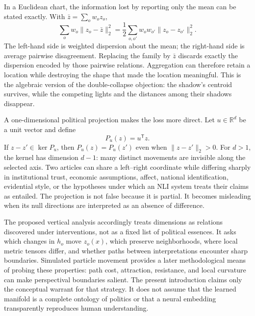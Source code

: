 In a Euclidean chart, the information lost by reporting only the mean can be stated exactly. With \(\bar z=\sum_o w_o z_o\),
\begin{equation}
    \sum_o w_o\lVert z_o-\bar z\rVert_2^2
    =\frac{1}{2}\sum_{o,o'}w_ow_{o'}
      \lVert z_o-z_{o'}\rVert_2^2.
    \label{eq:pairwise-dispersion}
\end{equation}
The left-hand side is weighted dispersion about the mean; the right-hand side is average pairwise disagreement. Replacing the family by \(\bar z\) discards exactly the dispersion encoded by those pairwise relations. Aggregation can therefore retain a location while destroying the shape that made the location meaningful. This is the algebraic version of the double-collapse objection: the shadow's centroid survives, while the competing lights and the distances among their shadows disappear.

A one-dimensional political projection makes the loss more direct. Let \(u\in\mathbb{R}^d\) be a unit vector and define
\begin{equation}
    P_u(z)=u^{\mathsf T}z.
    \label{eq:one-dimensional-projection}
\end{equation}
If \(z-z'\in\ker P_u\), then \(P_u(z)=P_u(z')\) even when \(\lVert z-z'\rVert_2>0\). For \(d>1\), the kernel has dimension \(d-1\): many distinct movements are invisible along the selected axis. Two articles can share a left--right coordinate while differing sharply in institutional trust, economic assumptions, affect, national identification, evidential style, or the hypotheses under which an NLI system treats their claims as entailed. The projection is not false because it is partial. It becomes misleading when its null directions are interpreted as an absence of difference.

The proposed vertical analysis accordingly treats dimensions as relations discovered under interventions, not as a fixed list of political essences. It asks which changes in \(h_o\) move \(z_o(x)\), which preserve neighborhoods, where local metric tensors differ, and whether paths between interpretations encounter sharp boundaries. Simulated particle movement provides a later methodological means of probing these properties: path cost, attraction, resistance, and local curvature can make perspectival boundaries salient. The present introduction claims only the conceptual warrant for that strategy. It does not assume that the learned manifold is a complete ontology of politics or that a neural embedding transparently reproduces human understanding.

